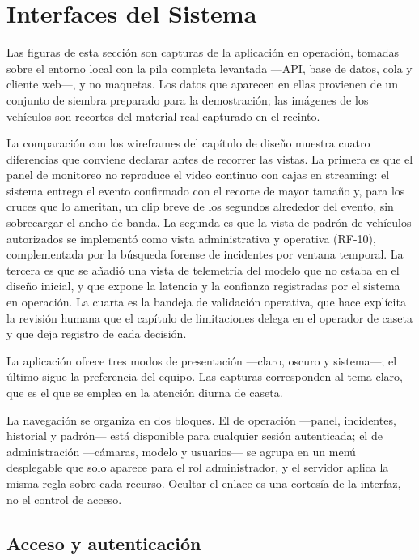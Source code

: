 \section{Interfaces del Sistema}

Las figuras de esta sección son capturas de la aplicación en operación, tomadas
sobre el entorno local con la pila completa levantada ---API, base de datos, cola
y cliente web---, y no maquetas. Los datos que aparecen en ellas provienen de un
conjunto de siembra preparado para la demostración; las imágenes de los vehículos
son recortes del material real capturado en el recinto.

La comparación con los wireframes del capítulo de diseño muestra cuatro diferencias
que conviene declarar antes de recorrer las vistas. La primera es que el panel de
monitoreo no reproduce el video continuo con cajas en streaming: el sistema entrega el
evento confirmado con el recorte de mayor tamaño y, para los cruces que lo ameritan, un
clip breve de los segundos alrededor del evento, sin sobrecargar el ancho de banda. La segunda es que la vista de padrón de vehículos autorizados se implementó
como vista administrativa y operativa (RF-10), complementada por la búsqueda forense
de incidentes por ventana temporal. La tercera es que se añadió una vista de telemetría del
modelo que no estaba en el diseño inicial, y que expone la latencia y la confianza
registradas por el sistema en operación. La cuarta es la bandeja de validación
operativa, que hace explícita la revisión humana que el capítulo de limitaciones
delega en el operador de caseta y que deja registro de cada decisión.

La aplicación ofrece tres modos de presentación ---claro, oscuro y sistema---; el
último sigue la preferencia del equipo. Las capturas corresponden al tema claro,
que es el que se emplea en la atención diurna de caseta.

La navegación se organiza en dos bloques. El de operación ---panel, incidentes,
historial y padrón--- está disponible para cualquier sesión autenticada; el de
administración ---cámaras, modelo y usuarios--- se agrupa en un menú desplegable
que solo aparece para el rol administrador, y el servidor aplica la misma regla
sobre cada recurso. Ocultar el enlace es una cortesía de la interfaz, no el control
de acceso.

\subsection{Acceso y autenticación}

